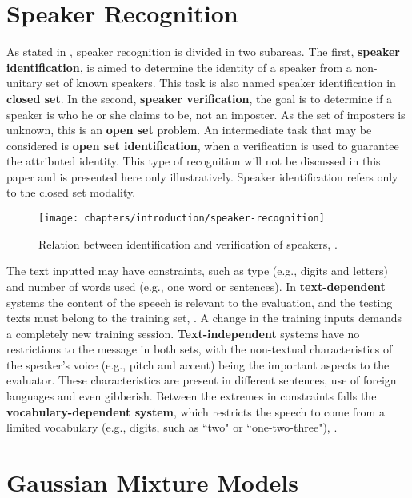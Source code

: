 \section{Speaker Recognition}
\label{sec:speaker-recognition}

As stated in , speaker recognition is divided in two subareas. The first, \textbf{speaker identification}, is aimed to determine the identity of a speaker from a non-unitary set of known speakers. This task is also named speaker identification in \textbf{closed set}. In the second, \textbf{speaker verification}, the goal is to determine if a speaker is who he or she claims to be, not an imposter. As the set of imposters is unknown, this is an \textbf{open set} problem. An intermediate task that may be considered is \textbf{open set identification}, when a verification is used to guarantee the attributed identity. This type of recognition will not be discussed in this paper and is presented here only illustratively. Speaker identification refers only to the closed set modality.

\begin{figure}[ht]
    \centering
    \texttt{[image: chapters/introduction/speaker-recognition]}
    \caption{Relation between identification and verification of speakers, .}
    \label{fig:speaker-recognition}
\end{figure}

The text inputted may have constraints, such as type (e.g., digits and letters) and number of words used (e.g., one word or sentences). In \textbf{text-dependent} systems the content of the speech is relevant to the evaluation, and the testing texts must belong to the training set, . A change in the training inputs demands a completely new training session. \textbf{Text-independent} systems have no restrictions to the message in both sets, with the non-textual characteristics of the speaker's voice (e.g., pitch and accent) being the important aspects to the evaluator. These characteristics are present in different sentences, use of foreign languages and even gibberish. Between the extremes in constraints falls the \textbf{vocabulary-dependent system}, which restricts the speech to come from a limited vocabulary (e.g., digits, such as ``two" or ``one-two-three"), .

\section{Gaussian Mixture Models}
\label{sec:gmm}

